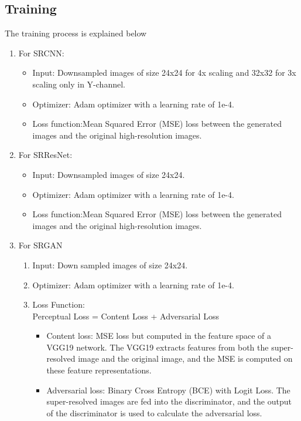     \subsection{Training}
    The training process is explained below
    \begin{enumerate}[label=(\roman*)]
        \item For SRCNN:
        \begin{itemize}
            \item Input: Downsampled images of size 24x24 for 4x scaling and 32x32 for 3x scaling only in Y-channel.
            \item Optimizer: Adam optimizer with a learning rate of 1e-4.
            \item Loss function:Mean Squared Error (MSE) loss between the generated images and the original high-resolution images.
        \end{itemize}
        \item For SRResNet:
        \begin{itemize}
            \item Input: Downsampled images of size 24x24.
            \item Optimizer: Adam optimizer with a learning rate of 1e-4.
            \item Loss function:Mean Squared Error (MSE) loss between the generated images and the original high-resolution images.
        \end{itemize}
        \item For SRGAN
        \begin{enumerate}[label=(\alph*)]
            \item Input: Down sampled images of size 24x24.
            \item Optimizer: Adam optimizer with a learning rate of 1e-4.
            \item Loss Function: \\
            Perceptual Loss = Content Loss + Adversarial Loss
            \begin{itemize}
                \item Content loss: MSE loss but computed in the feature space of a VGG19 network. The VGG19 extracts features from both the super-resolved image and the original image, and the MSE is computed on these feature representations.
                \item Adversarial loss: Binary Cross Entropy (BCE) with Logit Loss. The super-resolved images are fed into the discriminator, and the output of the discriminator is used to calculate the adversarial loss.
            \end{itemize}
        \end{enumerate}
    \end{enumerate}
